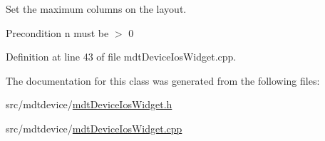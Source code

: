 Set the maximum columns on the layout. 

\begin{DoxyPrecond}{Precondition}
n must be $>$ 0 
\end{DoxyPrecond}


Definition at line 43 of file mdt\-Device\-Ios\-Widget.\-cpp.



The documentation for this class was generated from the following files\-:\begin{DoxyCompactItemize}
\item 
src/mdtdevice/\hyperlink{mdt_device_ios_widget_8h}{mdt\-Device\-Ios\-Widget.\-h}\item 
src/mdtdevice/\hyperlink{mdt_device_ios_widget_8cpp}{mdt\-Device\-Ios\-Widget.\-cpp}\end{DoxyCompactItemize}
